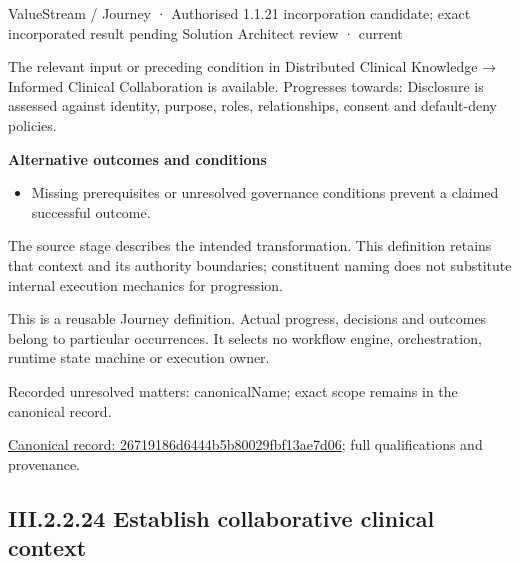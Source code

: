 \label{element:26719186d6444b5b80029fbf13ae7d06}
{\small ValueStream / Journey · Authorised 1.1.21 incorporation candidate; exact incorporated result pending Solution Architect review · current}\par

The relevant input or preceding condition in Distributed Clinical Knowledge → Informed Clinical Collaboration is available. Progresses towards: Disclosure is assessed against identity, purpose, roles, relationships, consent and default-deny policies.



\par\medskip\textbf{Alternative outcomes and conditions}\par


\begin{itemize}


\item Missing prerequisites or unresolved governance conditions prevent a claimed successful outcome.

\end{itemize}


The source stage describes the intended transformation. This definition retains that context and its authority boundaries; constituent naming does not substitute internal execution mechanics for progression.



This is a reusable Journey definition. Actual progress, decisions and outcomes belong to particular occurrences. It selects no workflow engine, orchestration, runtime state machine or execution owner.


{\small Recorded unresolved matters: canonicalName; exact scope remains in the canonical record.}\par
{\footnotesize \href{../../../../../../../continuum/strategy/value-stream/26719186d6444b5b80029fbf13ae7d06.md}{Canonical record: 26719186d6444b5b80029fbf13ae7d06}; full qualifications and provenance.}\par
\subsection*{III.2.2.24 Establish collaborative clinical context}
\label{navigation:III.2.2.24}

